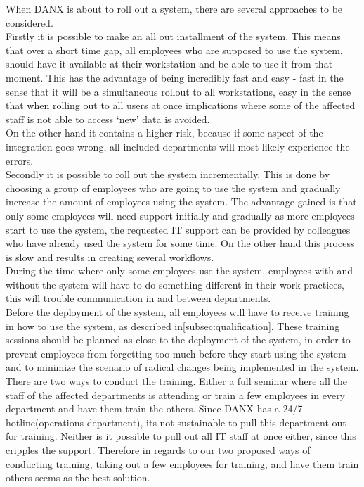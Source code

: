 When DANX is about to roll out a system, there are several approaches to be considered.\\
Firstly it is possible to make an all out installment of the system. This means that over a short time gap, all employees who are supposed to use the system, should have it available at their workstation and be able to use it from that moment.
This has the advantage of being incredibly fast and easy - fast in the sense that it will be a simultaneous rollout to all workstations, easy in the sense that when rolling out to all users at once implications where some of the affected staff is not able to access ‘new’ data is avoided.\\
On the other hand it contains a higher risk, because if some aspect of the integration goes wrong, all included departments will most likely experience the errors.\\
Secondly it is possible to roll out the system incrementally. This is done by choosing a group of employees who are going to use the system and gradually increase the amount of employees using the system.
The advantage gained is that only some employees will need support initially and gradually as more employees start to use the system, the requested IT support can be  provided by  colleagues who have already used the system for some time.
On the other hand this process is slow and results in creating several workflows.\\
During the time where only some employees use the system, employees with and without the system will have to do something different in their work practices, this will trouble communication in and between departments.\\
Before the deployment of the system, all employees will have to receive training in how to use the system, as described in\ref{subsec:qualification}. These training sessions should be planned as close to the deployment of the system, in order to prevent employees from forgetting too much before they start using the system and to minimize the scenario of radical changes being implemented in the system.\\
There are two ways to conduct the training. Either a full seminar where all the staff of the affected departments is attending or train a few employees in every department and have them train the others.
Since DANX has a 24/7 hotline(operations department), its not sustainable to pull this department out for training. Neither is it possible to pull out all IT staff at once either, since this cripples the support.
Therefore in regards to our two proposed ways of conducting training, taking out a few employees for training, and have them train others seems as the best solution.